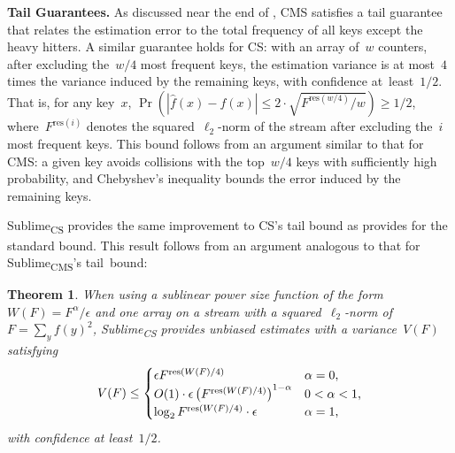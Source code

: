 \documentclass[sigconf]{acmart}
\newtheorem{theorem}{Theorem}[section]
\newcommand{\sketch}{Sublime}
\newcommand{\sketchcms}{\sketch\textsubscript{CMS}\xspace}
\newcommand{\sketchcs}{\sketch\textsubscript{CS}\xspace}
\begin{document}
\textbf{Tail Guarantees.}
As discussed near the end of , CMS satisfies a tail guarantee that relates the estimation error to the total frequency of all keys except the heavy hitters.
A similar guarantee holds for CS: with an array of~$w$ counters, after excluding the~$w/4$ most frequent keys, the estimation variance is at most~$4$ times the variance induced by the remaining keys, with confidence at~least~$1/2$.
That is, for any key~$x$, $\Pr\left(|\hat{f}(x)-f(x)| \leq 2 \cdot \sqrt{F^{\mathrm{res}(w/4)}/w}\right) \geq 1/2$, where~$F^{\mathrm{res}(i)}$ denotes the squared~$\ell_2$-norm of the stream after excluding the~$i$ most frequent keys.
This bound follows from an argument similar to that for CMS: a given key avoids collisions with the top~$w/4$ keys with sufficiently high probability, and Chebyshev's inequality bounds the error induced by the remaining keys.

\sketchcs provides the same improvement to CS's tail bound as  provides for the standard bound.
This result follows from an argument analogous to that for \sketchcms's \mbox{tail bound}:
\iftods
\vspace{-4mm}
\fi
\begin{theorem}
    \label{thm:cs-w-tail}
    When using a sublinear power size function of the form~$W(F)=F^\alpha/\epsilon$ and one array on a stream with a squared~$\ell_2${\nobreakdash-}norm of~$F = \sum_y f(y)^2$, \sketchcs provides unbiased estimates with a variance~$V(F)$ satisfying
	$$
    V(F) \leq  
    \begin{cases}
        \epsilon F^{\textup{res}(W(F)/4)} & \text{$\alpha=0$,} \\
        O(1) \cdot \epsilon \left( F^{\textup{res}(W(F)/4)} \right)^{1-\alpha} & \text{$0<\alpha<1$,} \\
        \log_2 F^{\textup{res}(W(F)/4)} \cdot \epsilon & \text{$\alpha=1$,}
	\end{cases}
    $$
    with confidence at least~$1/2$.
\end{theorem}
\end{document}
